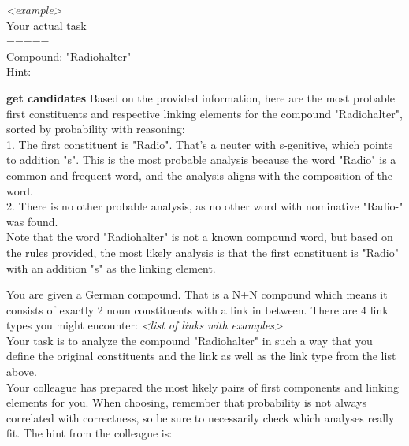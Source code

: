 \documentclass[11pt]{article}
\begin{document}
\begin{center}
\begin{tcolorbox}[colback=gray!10, colframe=black, width=\linewidth, left=1mm, right=1mm, title=Prediction of \texttt{radio\_halter} from \textit{Llama-instruct\textsubscript{+cand+par}}, breakable]
\begin{humanmessage}
            \textit{<example>} \\

            Your actual task \\
            ===== \\
            Compound: "Radiohalter" \\
            Hint:
        \end{humanmessage}
        
        \begin{aimessage}{\textbf{get candidates}}
            Based on the provided information, here are the most probable first constituents and respective linking elements for the compound "Radiohalter", sorted by probability with reasoning: \\
            
            1. The first constituent is "Radio". That's a neuter with s-genitive, which points to addition "s". This is the most probable analysis because the word "Radio" is a common and frequent word, and the analysis aligns with the composition of the word. \\
            2. There is no other probable analysis, as no other word with nominative "Radio-" was found. \\
            
            Note that the word "Radiohalter" is not a known compound word, but based on the rules provided, the most likely analysis is that the first constituent is "Radio" with an addition "s" as the linking element. \\
        \end{aimessage}

        \begin{humanmessage}
            You are given a German compound. That is a N+N compound which means it consists of exactly 2 noun constituents with a link in between. There are 4 link types you might encounter: \textit{<list of links with examples>} \\
            
            Your task is to analyze the compound "Radiohalter" in such a way that you define the original constituents and the link as well as the link type from the list above. \\
            
            Your colleague has prepared the most likely pairs of first components and linking elements for you. When choosing, remember that probability is not always correlated with correctness, so be sure to necessarily check which analyses really fit. The hint from the colleague is: \\
            

\end{humanmessage}
\end{tcolorbox}
\end{center}
\end{document}
